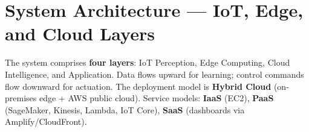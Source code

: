 \documentclass[11pt,a4paper]{article}
\begin{document}
\section{System Architecture — IoT, Edge, and Cloud Layers}

The system comprises \textbf{four layers}: IoT Perception, Edge Computing, Cloud Intelligence, and Application. Data flows upward for learning; control commands flow downward for actuation. The deployment model is \textbf{Hybrid Cloud} (on-premises edge + AWS public cloud). Service models: \textbf{IaaS} (EC2), \textbf{PaaS} (SageMaker, Kinesis, Lambda, IoT Core), \textbf{SaaS} (dashboards via Amplify/CloudFront).

\vspace{4pt}
\end{document}
